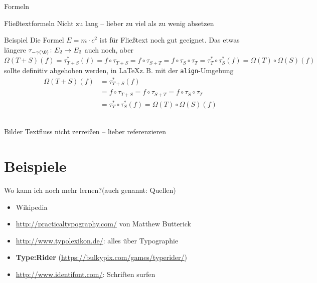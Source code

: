 \documentclass[ngerman,draft, usepdftitle=true]{beamer}
\newcommand*{\code}[1]{\texttt{#1}}
\begin{document}
\begin{frame}{Formeln}
  \begin{block}{Fließtextformeln}
    Nicht zu lang – lieber zu viel als zu wenig absetzen
  \end{block}
  
  \begin{beamerboxesrounded}[shadow=true]{Beispiel}
    \fontsize{9pt}{12pt}\selectfont\fontfamilylatinmodern
    Die Formel $E=m\cdot c^2$ ist für Fließtext noch gut geeignet.
    Das etwas längere $\tau_{-\gamma(\O)}\colon E_2\to E_2$ auch noch,
    aber 
    $\Omega(T+S)(f)
    = \tau^*_{T+S}(f)
    = f\circ\tau_{T+S} 
    = f\circ\tau_{S+T}
    = f\circ\tau_{S}\circ\tau_{T}
    = \tau^*_T\circ\tau^*_S(f)
    = \Omega(T)\circ\Omega(S)(f)$
    sollte definitiv abgehoben werden, in \LaTeX z.\,B. mit der
    \code{align}-Umgebung
    \begin{align*}
      \Omega(T+S)(f)
      &= \tau^*_{T+S}(f)\\
      &= f\circ\tau_{T+S} 
        = f\circ\tau_{S+T}
        = f\circ\tau_{S}\circ\tau_{T}\\
      &= \tau^*_T\circ\tau^*_S(f)
        = \Omega(T)\circ\Omega(S)(f)
    \end{align*}~\\
  \end{beamerboxesrounded}
\end{frame}

\begin{frame}{Bilder}
  Textfluss nicht zerreißen – lieber referenzieren
\end{frame}


\section{Beispiele}


\begin{frame}{Wo kann ich noch mehr lernen?}{(auch genannt: Quellen)}
\begin{itemize}
  \item Wikipedia
  \item \url{http://practicaltypography.com/} von Matthew Butterick
  \item \url{http://www.typolexikon.de/}: alles über Typographie
  \item \textbf{Type:Rider} (\url{https://bulkypix.com/games/typerider/})
  \item \url{http://www.identifont.com/}: Schriften surfen
  \end{itemize}
\end{frame}
\end{document}
